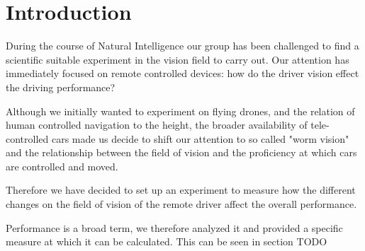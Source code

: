 \chapter{Introduction}
During the course of Natural Intelligence our group has been challenged to find a scientific suitable experiment in the vision field to carry out. 
Our attention has immediately focused on remote controlled devices: how do the driver vision effect the driving performance?

 Although we initially wanted to experiment on flying drones, and the relation of human controlled navigation to the height, the broader availability of tele-controlled cars made us decide to shift our attention to so called "worm vision" and the relationship between the field of vision and the proficiency at which cars are controlled and moved.
 
 Therefore we have decided to set up an experiment to measure how the different changes on the field of vision of the remote driver affect the overall performance. 
 
 Performance is a broad term, we therefore analyzed it and provided a specific measure at which it can be calculated. This can be seen in section TODO
